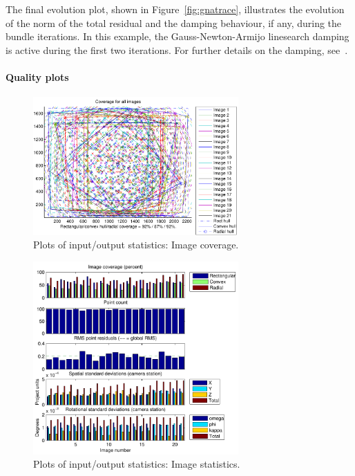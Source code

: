 \documentclass{article}
\begin{document}
The final evolution plot, shown in Figure~\ref{fig:gnatrace},
illustrates the evolution of the norm of the total residual and the
damping behaviour, if any, during the bundle iterations. In this
example, the Gauss-Newton-Armijo linesearch damping is active during
the first two iterations. For further details on the damping,
see~\citet{Borlin2013:Bundle}.

\paragraph{Quality plots}

\begin{figure}
  \centering
  \includegraphics[width=0.7\textwidth]{ill/ccamcoverage}
  \caption{Plots of input/output statistics: Image coverage.}
  \label{fig:ccamCoverage}
\end{figure}

\begin{figure}
  \centering
  \includegraphics[width=0.7\textwidth]{ill/ccamimstats}
  \caption{Plots of input/output statistics: Image statistics.}
  \label{fig:ccamImstats}
\end{figure}
\end{document}
